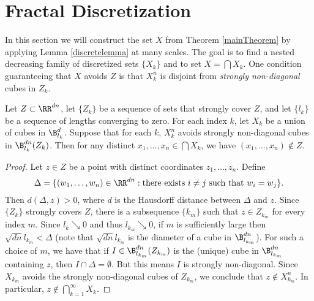 \section{Fractal Discretization}\label{discretizationsection}
In this section we will construct the set $X$ from Theorem \ref{mainTheorem} by applying Lemma \ref{discretelemma} at many scales. The goal is to find a nested decreasing family of discretized sets $\{ X_k \}$ and to set $X = \bigcap X_k$. One condition guaranteeing that $X$ avoids $Z$ is that $X_k^n$ is disjoint from {\it strongly non-diagonal} cubes in $Z_k$.

\begin{lemma} \label{stronglydiagonal}
	Let $Z \subset \RR^{dn}$, let $\{Z_k\}$ be a sequence of sets that strongly cover $Z$, and let $\{ l_k \}$ be a sequence of lengths converging to zero. For each index $k$, let $X_k$ be a union of cubes in $\B^d_{l_k}$. Suppose that for each $k$, $X_k^n$ avoids strongly non-diagonal cubes in $\B^{dn}_{l_k}(Z_k)$. Then for any distinct $x_1, \dots, x_n \in \bigcap X_k$, we have $(x_1, \dots, x_n) \not \in Z$.
\end{lemma}
\begin{proof}
	Let $z \in Z$ be a point with distinct coordinates $z_1, \dots, z_n$. Define
	\[ \Delta = \{ (w_1, \dots, w_n) \in \RR^{dn}: \text{there exists $i \neq j$ such that $w_i = w_j$} \}. \]
	Then $d(\Delta,z) > 0$, where $d$ is the Hausdorff distance between $\Delta$ and $z$. Since $\{ Z_k \}$ strongly covers $Z$, there is a subsequence $\{ k_m \}$ such that $z \in Z_{k_m}$ for every index $m$. Since $l_k\searrow 0$ and thus $l_{k_m}\searrow 0$, if $m$ is sufficiently large then $\sqrt{dn}l_{k_m}<\Delta$ (note that $\sqrt{dn}l_{k_m}$ is the diameter of a cube in $\B_{l_{k_m}}^{dn}$). For such a choice of $m$, we have that if $I\in \B_{l_{k_m}}^{dn}(Z_{k_m})$ is the (unique) cube in $\B_{l_{k_m}}^{dn}$ containing $z$, then $I\cap\Delta=\emptyset$. But this means $I$ is strongly non-diagonal. Since $X_{k_m}$ avoids the strongly non-diagonal cubes of $Z_{k_m}$, we conclude that $z \not \in X_{k_m}^n$. In particular, $z\not\in \bigcap_{k=1}^\infty X_k$.
\end{proof}

